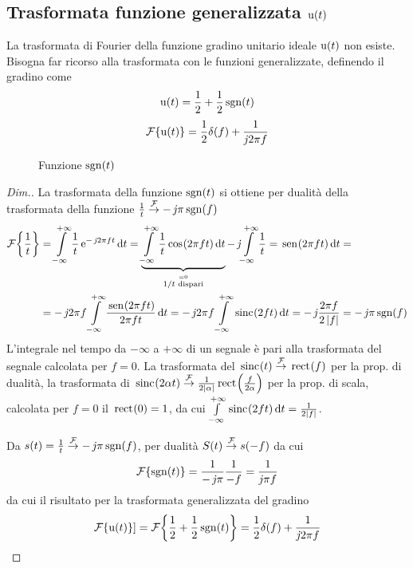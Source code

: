 \subsection{Trasformata funzione generalizzata \texorpdfstring{$\operatorname{u}(t)$}{gradino}}
La trasformata di Fourier della funzione gradino unitario ideale $\operatorname{u}(t)$ non esiste. Bisogna far ricorso alla trasformata con le funzioni generalizzate, definendo il gradino come
\[\operatorname{u}(t)=\frac{1}{2}+\frac{1}{2}\operatorname{sgn}(t)\]
\begin{equation}
\operatorname{\mathcal{F}}\!\left\lbrace{\operatorname{u}(t)}\right\rbrace=\frac{1}{2}\delta(f)+\frac{1}{\operatorname{\mathit{j}\!} 2\pi f}
\end{equation}
\begin{figure}[!ht]
\centering
{}
\caption{Funzione $\operatorname{sgn}(t)$}
\end{figure}

\begin{proof}[Dim.]
La trasformata della funzione $\operatorname{sgn}(t)$ si ottiene per dualità della trasformata della funzione $\frac{1}{t}\overset{\operatorname{\mathcal{F}}}{\to}-\operatorname{\mathit{j}\!}\pi\operatorname{sgn}(f)$
\begin{align*}
\fourier{\frac{1}{t}}&=\intinf{\frac{1}{t}\e{-\imath 2\pi f t}}{t}= \underbrace{\intinf{\frac{1}{t}\cos{2\pi f t}}{t}}_{\stackrel{=0}{1/t \text{ dispari}}} -\imath\intinf{\frac{1}{t}=\sen{2\pi f t}}{t}=\\
&=-\imath 2\pi f\intinf{\frac{\sen{2\pi f t}}{2\pi f t}}{t}=-\imath 2\pi f\intinf{\sinc{2 f t}}{t}= -\imath\frac{2\pi f}{2\abs{f}} = -\imath\pi\sgn(f)
\end{align*}
L'integrale nel tempo da $-\infty$ a $+\infty$ di un segnale è pari alla trasformata del segnale calcolata per $f=0$. La trasformata del $\,{\operatorname{sinc}}^{}\!\left({t}\right)\overset{\operatorname{\mathcal{F}}}{\to}\,{\operatorname{rect}}^{}\!\left({f}\right)$ per la prop. di dualità, la trasformata di $\,{\operatorname{sinc}}^{}\!\left({2\alpha t}\right)\overset{\operatorname{\mathcal{F}}}{\to}\frac{1}{2\left|{\alpha}\right|}\,{\operatorname{rect}}^{}\!\left({\frac{f}{2\alpha}}\right)$ per la prop. di scala, calcolata per $f=0$ il $\,{\operatorname{rect}}^{}\!\left({0}\right)=1$, da cui
$\int\limits_{-\infty}^{+\infty}{\,{\operatorname{sinc}}^{}\!\left({2 f t}\right)}{\,\mathop{}\!\mathrm{d}{t}}=\frac{1}{2\left|{f}\right|}$.

Da $s(t)=\frac{1}{t}\overset{\operatorname{\mathcal{F}}}{\to} -\operatorname{\mathit{j}\!}\pi\operatorname{sgn}(f)$, per dualità $S(t)\overset{\operatorname{\mathcal{F}}}{\to} s(-f)$ da cui \[\operatorname{\mathcal{F}}\!\left\lbrace{\operatorname{sgn}(t)}\right\rbrace=\frac{1}{-\operatorname{\mathit{j}\!}\pi}\frac{1}{-f}=\frac{1}{\operatorname{\mathit{j}\!}\pi f}\] da cui il risultato per la trasformata generalizzata del gradino \[\operatorname{\mathcal{F}}\!\left\lbrace{\operatorname{u}(t)}\right\rbrace]=\operatorname{\mathcal{F}}\!\left\lbrace{\frac{1}{2}+\frac{1}{2}\operatorname{sgn}(t)}\right\rbrace=\frac{1}{2}\delta(f)+\frac{1}{\operatorname{\mathit{j}\!} 2\pi f}\qedhere\]
\end{proof}

